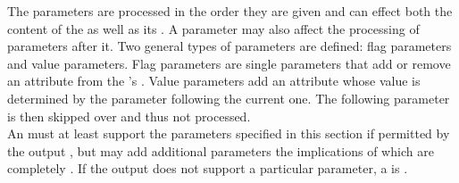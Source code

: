 The parameters are processed in the order they are given and can effect both the content of the  as well as its . A parameter may also affect the processing of parameters after it. Two general types of parameters are defined: flag parameters and value parameters. Flag parameters are single parameters that add or remove an attribute from the 's . Value parameters add an attribute whose value is determined by the parameter following the current one. The following parameter is then skipped over and thus not processed. \\

An  must at least support the parameters specified in this section if permitted by the output , but may add additional parameters the implications of which are completely . If the output  does not support a particular parameter, a  is . \\





